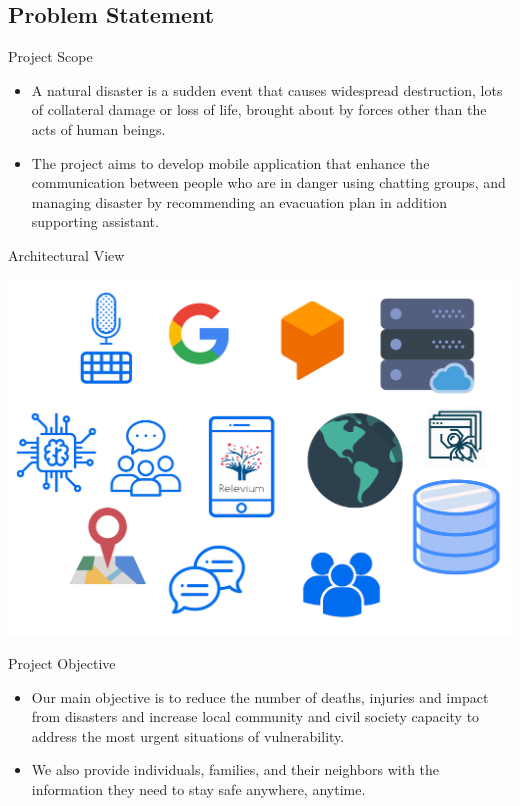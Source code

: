 \documentclass{beamer}
\begin{document}
\subsection{Problem Statement}

\begin{frame}{Project Scope}

\begin{itemize}

\item<1-> A natural disaster is a sudden event that causes widespread destruction, lots of collateral damage or loss of life, brought about by forces other than the acts of human beings.

\item<2-> The project aims to develop mobile application that enhance the
communication between people who are in danger using chatting groups, and managing disaster by recommending an evacuation plan in addition supporting assistant.

\end{itemize}    
\end{frame}

\begin{frame}{Architectural View}

\includegraphics[width=\textwidth]{img3/overview_art.pdf}
    
\end{frame}


\begin{frame}{Project Objective}

\begin{itemize}[<+->]
    \item Our main objective is to reduce the number of deaths, injuries and impact from disasters and increase local community and civil society capacity to address the most urgent situations of vulnerability.
    
    \item We also provide individuals, families, and their neighbors with the information they need to stay safe anywhere, anytime.
    \end{itemize}    
\end{frame}
\end{document}
